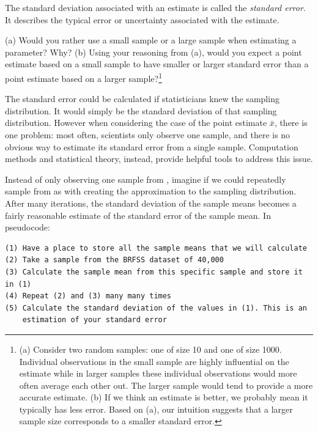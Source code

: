 \begin{termBox}{
The standard deviation associated with an estimate is called the \emph{standard error}. It describes the typical error or uncertainty associated with the estimate.}
\end{termBox}

\begin{exercise}
(a) Would you rather use a small sample or a large sample when estimating a parameter? Why? (b) Using your reasoning from (a), would you expect a point estimate based on a small sample to have smaller or larger standard error than a point estimate based on a larger sample?\footnote{(a) Consider two random samples: one of size 10 and one of size 1000. Individual observations in the small sample are highly influential on the estimate while in larger samples these individual observations would more often average each other out. The larger sample would tend to provide a more accurate estimate. (b) If we think an estimate is better, we probably mean it typically has less error. Based on (a), our intuition suggests that a larger sample size corresponds to a smaller standard error.}
\end{exercise}

The standard error could be calculated if statisticians knew the sampling distribution. It would simply be the standard deviation of that sampling distribution. However when considering the case of the point estimate $\bar{x}$, there is one problem: most often, scientists only observe one sample, and there is no obvious way to estimate its standard error from a single sample. Computation methods and statistical theory, instead, provide helpful tools to address this issue. 

Instead of only observing one sample from , imagine if we could repeatedly sample from  as with creating the approximation to the sampling distribution. After many iterations, the standard deviation of the sample means becomes a fairly reasonable estimate of the standard error of the sample mean. In pseudocode: 
\begin{verbatim}
(1) Have a place to store all the sample means that we will calculate
(2) Take a sample from the BRFSS dataset of 40,000
(3) Calculate the sample mean from this specific sample and store it in (1)
(4) Repeat (2) and (3) many many times 
(5) Calculate the standard deviation of the values in (1). This is an 
	estimation of your standard error
\end{verbatim}

